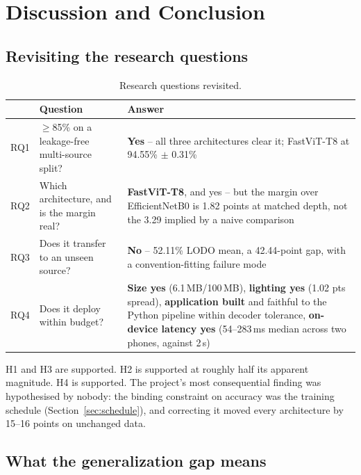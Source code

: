 \documentclass{article}
\begin{document}
\section{Discussion and Conclusion}
\label{sec:discussion}

\subsection{Revisiting the research questions}

\begin{table}[t]
\centering
\caption{Research questions revisited.}
\label{tab:rq}
\begin{tabular}{@{}p{1.0cm}p{5.6cm}p{8.4cm}@{}}
\toprule
 & Question & Answer \\
\midrule
RQ1 & $\geq$85\% on a leakage-free multi-source split? & \textbf{Yes} -- all three architectures clear it; FastViT-T8 at 94.55\% $\pm$ 0.31\% \\
RQ2 & Which architecture, and is the margin real? & \textbf{FastViT-T8}, and yes -- but the margin over EfficientNetB0 is 1.82 points at matched depth, not the 3.29 implied by a naive comparison \\
RQ3 & Does it transfer to an unseen source? & \textbf{No} -- 52.11\% LODO mean, a 42.44-point gap, with a convention-fitting failure mode \\
RQ4 & Does it deploy within budget? & \textbf{Size yes} (6.1\,MB/100\,MB), \textbf{lighting yes} (1.02 pts spread), \textbf{application built} and faithful to the Python pipeline within decoder tolerance, \textbf{on-device latency yes} (54--283\,ms median across two phones, against 2\,s) \\
\bottomrule
\end{tabular}
\end{table}

H1 and H3 are supported. H2 is supported at roughly half its apparent magnitude. H4 is supported. The
project's most consequential finding was hypothesised by nobody: the binding constraint on accuracy was
the training schedule (Section~\ref{sec:schedule}), and correcting it moved every architecture by 15--16
points on unchanged data.

\subsection{What the generalization gap means}
\end{document}
